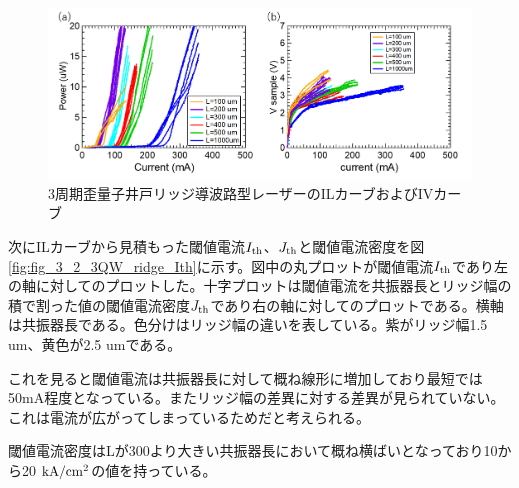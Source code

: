 {\begin{figure}[h]
	\centering
	\includegraphics[width=15cm]{figure/fig_3_2_3QW_ridge_IL.png}
		\caption{3周期歪量子井戸リッジ導波路型レーザーのILカーブおよびIVカーブ}
		\label{fig:fig_3_2_3QW_ridge_IL}
\end{figure}


次にILカーブから見積もった閾値電流$I_{\rm{th}}$、$J_{\rm{th}}$と閾値電流密度を図\ref{fig:fig_3_2_3QW_ridge_Ith}に示す。図中の丸プロットが閾値電流$I_{\rm{th}}$であり左の軸に対してのプロットした。十字プロットは閾値電流を共振器長とリッジ幅の積で割った値の閾値電流密度$J_{\rm{th}}$であり右の軸に対してのプロットである。横軸は共振器長である。色分けはリッジ幅の違いを表している。紫がリッジ幅1.5 um、黄色が2.5 umである。

これを見ると閾値電流は共振器長に対して概ね線形に増加しており最短では50mA程度となっている。またリッジ幅の差異に対する差異が見られていない。これは電流が広がってしまっているためだと考えられる。

閾値電流密度はLが300より大きい共振器長において概ね横ばいとなっており10から20 $\rm{kA/cm^2}$の値を持っている。


}
